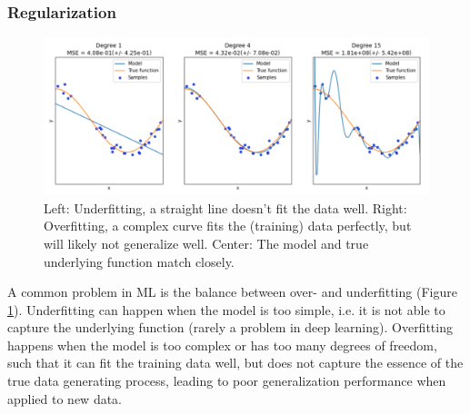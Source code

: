 \subsubsection*{Regularization}
\begin{figure}[h]
    \centering
    \includegraphics[width=1.2\textwidth]{chapters/NLP/figures/over_and_underfitting.png}
    \caption{Left: Underfitting, a straight line doesn't fit  the data well.
    Right: Overfitting, a complex curve fits the (training) data perfectly, but will likely not generalize well.
    Center: The model and true underlying function match closely.}
    \label{fig:over_and_underfitting}
\end{figure}
A common problem in ML is the balance between over- and underfitting (Figure \ref{fig:over_and_underfitting}).
Underfitting can happen when the model is too simple, i.e. it is not able to capture the underlying function (rarely a problem in deep learning).
Overfitting happens when the model is too complex or has too many degrees of freedom, such that it can fit the training data well, but does not capture the essence of the true data generating process, leading to poor generalization performance when applied to new data.

